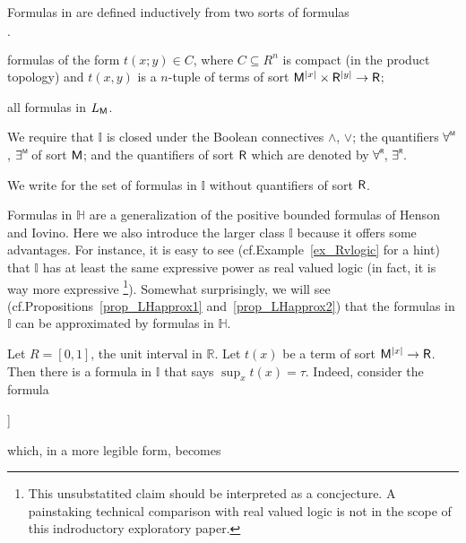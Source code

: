\documentclass[10pt,oneside]{amsproc}
\newcommand{\mylabel}[1]{{#1}\hfill}
\renewenvironment{itemize}
  {\begin{list}{$\cdot$}{%
  \setlength{\parskip}{0mm}
  \setlength{\topsep}{.2\baselineskip}
  \setlength{\rightmargin}{0mm}
  \setlength{\listparindent}{0mm}
  \setlength{\itemindent}{0mm}
  \setlength{\labelwidth}{3ex}
  \setlength{\itemsep}{.2\baselineskip}
  \setlength{\parsep}{.2\baselineskip}
  \setlength{\partopsep}{0mm}
  \setlength{\labelsep}{1ex}
  \setlength{\leftmargin}{\labelwidth+\labelsep}
  \let\makelabel\mylabel}}{%
\end{list}}
\renewcommand*{\emph}[1]{%
   \smash{\tikz[baseline]\node[rectangle, fill=teal!25, rounded corners, inner xsep=0.5ex, inner ysep=0.2ex, anchor=base, minimum height = 2.7ex]{#1};}}
\begin{document}
\begin{definition}\label{def_LL}
  Formulas in \emph{$\mathds{I}$\/} are defined inductively from two sorts of \emph{$\mathds{I}$-atomic\/} formulas
  \begin{itemize}
  \item[i.] formulas of the form $t(x;y)\in C$, where $C\subseteq R^n$ is compact (in the product topology) and $t(x,y)$ is a $n$-tuple of terms of sort ${\sf M}^{|x|}\times {\sf R}^{|y|}\to {\sf R}$; 
  \item[ii.] all formulas in $L_{\sf M}$.
  \end{itemize}
  We require that $\mathds{I}$ is closed under the Boolean connectives $\wedge$, $\vee$; the quantifiers $\forallM$, $\existsM $ of sort ${\sf M}$; and the quantifiers of sort ${\sf R}$ which are denoted by $\forallR $, $\existsR$.

  We write \emph{$\mathds{H}$ \/} for the set of formulas in $\mathds{I}$ without quantifiers of sort ${\sf R}$.
\end{definition}

Formulas in $\mathds{H}$ are a generalization of the positive bounded formulas of Henson and Iovino.
Here we also introduce the larger class $\mathds{I}$ because it offers some advantages. 
For instance, it is easy to see (cf.\@ Example~\ref{ex_Rvlogic} for a hint) that $\mathds{I}$ has at least the same expressive power as real valued logic (in fact, it is way more expressive%
\footnote{This unsubstatited claim should be interpreted as a concjecture.
A painstaking technical comparison with real valued logic is not in the scope of this indroductory exploratory paper.}).
Somewhat surprisingly, we will see (cf.\@ Propositions~\ref{prop_LHapprox1} and~\ref{prop_LHapprox2}) that the formulas in $\mathds{I}$ can be approximated by formulas in $\mathds{H}$.

\begin{example}\label{ex_Rvlogic}
  Let $R=[0,1]$, the unit interval in $\mathds{R}$.
  Let $t(x)$ be a term of sort ${\sf M}^{|x|}\to {\sf R}$.
  Then there is a formula in $\mathds{I}$ that says $\sup_{x} t(x)=\tau$.
  Indeed, consider the formula

  {\wedge}{\forallR \varepsilon \Big[\varepsilon\in\{0\}\ \vee\ \existsM x\ \big[\tau\dotminus (t(x)+\varepsilon)\in\{0\}\big]\Big]}

  which, in a more legible form, becomes

\end{example}
\end{document}
